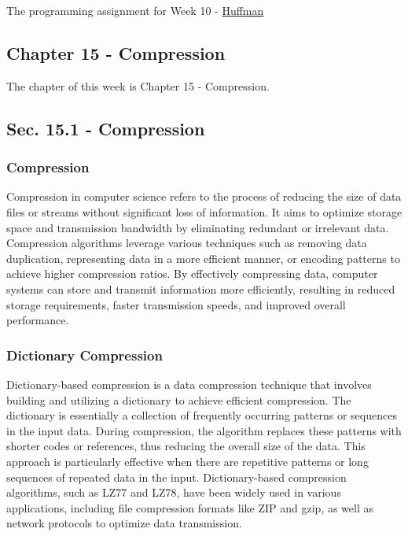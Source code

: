 The programming assignment for Week 10 - \href{https://github.com/cu-cspb-2270-Summer-2023/pa8-RelativiBit}{Huffman}

\subsection{Chapter 15 - Compression}

The chapter of this week is Chapter 15 - Compression.

\subsection*{Sec. 15.1 - Compression}

\subsubsection{Compression}

Compression in computer science refers to the process of reducing the size of data files or streams without significant loss of information. It aims to optimize storage space and transmission bandwidth 
by eliminating redundant or irrelevant data. Compression algorithms leverage various techniques such as removing data duplication, representing data in a more efficient manner, or encoding patterns to 
achieve higher compression ratios. By effectively compressing data, computer systems can store and transmit information more efficiently, resulting in reduced storage requirements, faster transmission 
speeds, and improved overall performance.

\subsubsection{Dictionary Compression}

Dictionary-based compression is a data compression technique that involves building and utilizing a dictionary to achieve efficient compression. The dictionary is essentially a collection of frequently 
occurring patterns or sequences in the input data. During compression, the algorithm replaces these patterns with shorter codes or references, thus reducing the overall size of the data. This approach 
is particularly effective when there are repetitive patterns or long sequences of repeated data in the input. Dictionary-based compression algorithms, such as LZ77 and LZ78, have been widely used in 
various applications, including file compression formats like ZIP and gzip, as well as network protocols to optimize data transmission.

